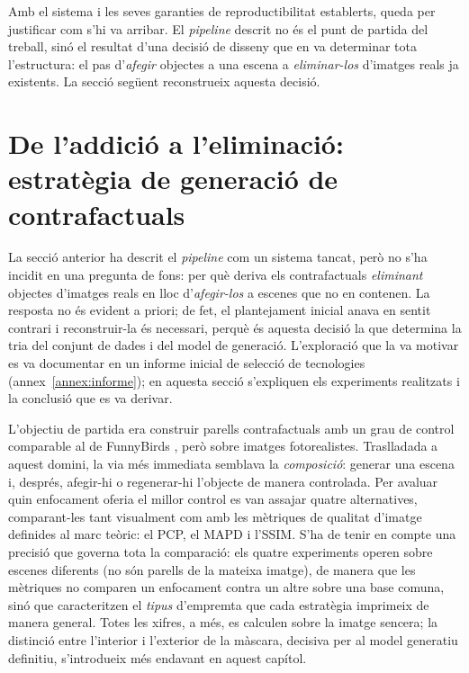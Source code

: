 Amb el sistema i les seves garanties de reproductibilitat establerts, queda per justificar com s'hi va arribar. El \emph{pipeline} descrit no és el punt de partida del treball, sinó el resultat d'una decisió de disseny que en va determinar tota l'estructura: el pas d'\emph{afegir} objectes a una escena a \emph{eliminar-los} d'imatges reals ja existents. La secció següent reconstrueix aquesta decisió.

\section{De l'addició a l'eliminació: estratègia de generació de contrafactuals}
La secció anterior ha descrit el \emph{pipeline} com un sistema tancat, però no s'ha incidit en una pregunta de fons: per què deriva els contrafactuals \emph{eliminant} objectes d'imatges reals en lloc d'\emph{afegir-los} a escenes que no en contenen. La resposta no és evident a priori; de fet, el plantejament inicial anava en sentit contrari i reconstruir-la és necessari, perquè és aquesta decisió la que determina la tria del conjunt de dades i del model de generació. L'exploració que la va motivar es va documentar en un informe inicial de selecció de tecnologies (annex~\ref{annex:informe}); en aquesta secció s'expliquen els experiments realitzats i la conclusió que es va derivar.

L'objectiu de partida era construir parells contrafactuals amb un grau de control comparable al de FunnyBirds \cite{Hesse2023}, però sobre imatges fotorealistes. Traslladada a aquest domini, la via més immediata semblava la \emph{composició}: generar una escena i, després, afegir-hi o regenerar-hi l'objecte de manera controlada. Per avaluar quin enfocament oferia el millor control es van assajar quatre alternatives, comparant-les tant visualment com amb les mètriques de qualitat d'imatge definides al marc teòric: el \ac{PCP}, el \ac{MAPD} i l'\ac{SSIM}. S'ha de tenir en compte una precisió que governa tota la comparació: els quatre experiments operen sobre escenes diferents (no són parells de la mateixa imatge), de manera que les mètriques no comparen un enfocament contra un altre sobre una base comuna, sinó que caracteritzen el \emph{tipus} d'empremta que cada estratègia imprimeix de manera general. Totes les xifres, a més, es calculen sobre la imatge sencera; la distinció entre l'interior i l'exterior de la màscara, decisiva per al model generatiu definitiu, s'introdueix més endavant en aquest capítol.

